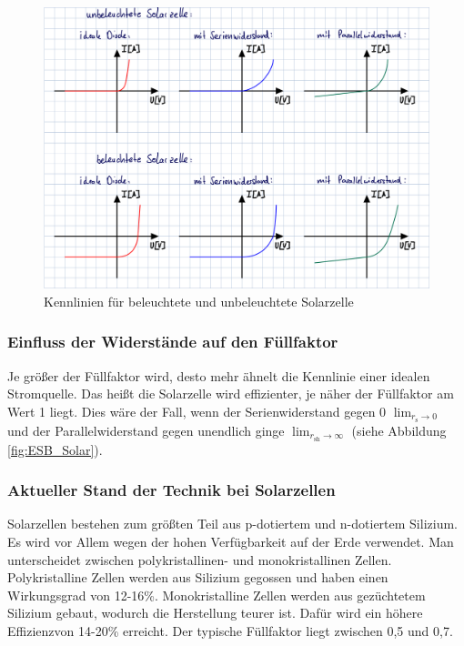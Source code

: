 \documentclass[a4paper]{scrartcl}
\numberwithin{equation}{subsection}
\begin{document}
\begin{figure}[H]
\includegraphics[width=16cm]{Kennlinie}
\centering
\caption{Kennlinien für beleuchtete und unbeleuchtete Solarzelle}
\centering
\label{fig:Kennlinien}
\end{figure}

\subsubsection{Einfluss der Widerstände auf den Füllfaktor}
Je größer der Füllfaktor wird, desto mehr ähnelt die Kennlinie einer idealen Stromquelle. Das heißt die
Solarzelle wird effizienter, je näher der Füllfaktor am Wert 1 liegt. Dies wäre der Fall, wenn
der Serienwiderstand gegen 0 $\lim_{r_{\text{s}} \to 0}$ und der Parallelwiderstand gegen unendlich ginge
$\lim_{r_{\text{sh}} \to \infty}$ (siehe Abbildung \ref{fig:ESB_Solar}).

\subsubsection{Aktueller Stand der Technik bei Solarzellen}
Solarzellen bestehen zum größten Teil aus p-dotiertem und n-dotiertem Silizium.
Es wird vor Allem wegen der hohen Verfügbarkeit auf der Erde verwendet.
Man unterscheidet zwischen polykristallinen- und monokristallinen Zellen.
Polykristalline Zellen werden aus Silizium gegossen und haben einen Wirkungsgrad
von 12-16\%. Monokristalline Zellen werden aus gezüchtetem Silizium gebaut, wodurch die Herstellung
teurer ist. Dafür wird ein höhere Effizienzvon 14-20\% erreicht. Der typische Füllfaktor liegt
zwischen 0,5 und 0,7. \cite{solar}
\end{document}
